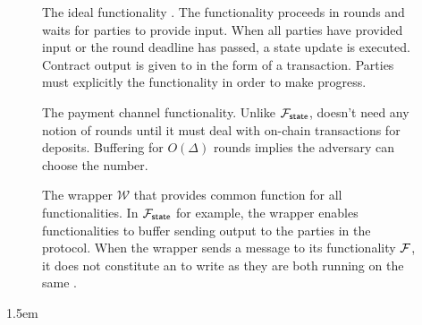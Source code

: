 \documentclass[11pt]{article}
\begin{document}
\begin{figure}
	
	\caption{The ideal functionality \Fstate. The functionality proceeds in rounds and waits for parties to provide input. When all parties have provided input or the round deadline has passed, a state update is executed. Contract output is given to \Gledger in the form of a transaction. Parties must explicitly  the functionality in order to make progress. }
\end{figure}

\begin{figure}
	
	\caption{The payment channel functionality. Unlike $\mathcal{F}_{{\mathsf {state}}}$, doesn't need any notion of rounds until it must deal with on-chain transactions for deposits. Buffering for $O(\Delta)$ rounds implies the adversary can choose the number.}
\end{figure}

\begin{figure}
	
	\caption{The wrapper $\mathcal{W}$ that provides common function for all functionalities. In $\mathcal{F}_{{\mathsf {state}}}$ for example, the wrapper enables functionalities to buffer sending output to the parties in the protocol. When the wrapper sends a message to its functionality $\mathcal{F}$, it does not constitute an  to  write as they are both running on the same .}
\end{figure}




\emergencystretch 1.5em

\end{document}
